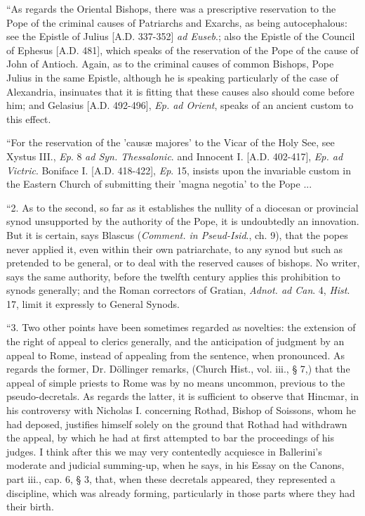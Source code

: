 ``As regards the Oriental Bishops, there was a
prescriptive reservation to the Pope of the criminal causes of
Patriarchs and Exarchs, as being autocephalous: see the Epistle of
Julius [A.D. 337-352] \emph{ad
Euseb}.; also the Epistle of the Council of Ephesus [A.D.
481], which speaks of the reservation of the Pope of the cause of John
of Antioch. Again, as to the criminal causes of common Bishops, Pope
Julius in the same Epistle, although he is speaking particularly of
the case of Alexandria, insinuates that it is fitting that these
causes also should come before him; and Gelasius [A.D.
492-496], \emph{Ep. ad Orient}, speaks of an ancient custom to this
effect.

``For the reservation of the 'causæ majores' to
the Vicar of the Holy See, see Xystus III., \emph{Ep}. 8 \emph{ad Syn.
Thessalonic}. and Innocent I. [A.D.
402-417], \emph{Ep. ad Victric}. Boniface I. [A.D.
418-422], \emph{Ep}. 15, insists upon the invariable custom in the
Eastern Church of submitting their 'magna negotia' to the Pope ...

``2. As to the second, so far as it establishes
the nullity of a diocesan or provincial synod unsupported by the
authority of the Pope, it is undoubtedly an innovation. But it is
certain, says Blascus (\emph{Comment. in Pseud-Isid}., ch. 9), that
the popes never applied it, even within their own patriarchate, to any
synod but such as pretended to be general, or to deal with the
reserved causes of bishops. No writer, says the same authority, before
the twelfth century applies this prohibition to synods generally; and
the Roman correctors of Gratian, \emph{Adnot. ad Can}. 4, \emph{Hist}.
17, limit it expressly to General Synods.

``3. Two other points have been sometimes regarded
as novelties: the extension of the right of appeal to clerics
generally, and the anticipation of judgment by an appeal to Rome,
instead of appealing from the sentence, when pronounced. As regards
the former, Dr. Döllinger remarks, (Church Hist., vol. iii., § 7,)
that the appeal of simple priests to Rome was by no means uncommon,
previous to the pseudo-decretals. As regards the latter, it is
sufficient to observe that Hincmar, in his controversy with Nicholas
I. concerning Rothad, Bishop of Soissons, whom he had deposed,
justifies himself solely on the ground that Rothad had withdrawn the
appeal, by which he had at first attempted to bar the proceedings of
his judges. I think after this we may very contentedly acquiesce
in Ballerini's moderate and judicial summing-up, when he says, in his
Essay on the Canons, part iii., cap. 6, § 3, that, when these
decretals appeared, they represented a discipline, which was already
forming, particularly in those parts where they had their birth.

